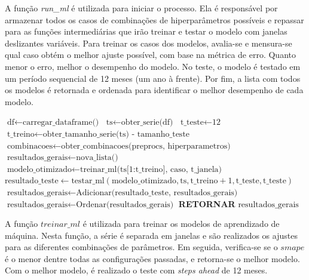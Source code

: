 \documentclass[12pt]{tcc}
\begin{document}
A função \textit{run\_ml} é utilizada para iniciar o processo. Ela é responsável por armazenar todos os casos de combinações de hiperparâmetros possíveis e repassar para as funções intermediárias que irão treinar e testar o modelo com janelas deslizantes variáveis. Para treinar os casos dos modelos, avalia-se e mensura-se qual caso obtém o melhor ajuste possível, com base na métrica de erro. Quanto menor o erro, melhor o desempenho do modelo. No teste, o modelo é testado em um período sequencial de 12 meses (um ano à frente). Por fim, a lista com todos os modelos é retornada e ordenada para identificar o melhor desempenho de cada modelo.

\begin{algorithm}
\caption{run\_ml}
\label{alg:main_experiment}
\begin{algorithmic}[1]
\State $\text{df} \gets \text{carregar\_dataframe()}$
\State $\text{ts} \gets \text{obter\_serie(df)}$
\State $\text{t\_teste} \gets \text{12}$
\State $\text{t\_treino} \gets \text{obter\_tamanho\_serie(ts) - tamanho\_teste}$
\State $\text{combinacoes} \gets \text{obter\_combinacoes(preprocs, hiperparametros)}$
\State $\text{resultados\_gerais} \gets \text{nova\_lista()}$
    \State $\text{modelo\_otimizado} \gets \text{treinar\_ml(ts[1:t\_treino], caso, t\_janela)}$
    \State $\text{resultado\_teste} \gets \text{testar\_ml}(\text{modelo\_otimizado}, \text{ts}, \text{t\_treino} + 1, \text{t\_teste}, \text{t\_teste})$
    \State $\text{resultados\_gerais} \gets \text{Adicionar(resultado\_teste, resultados\_gerais)}$
\EndFor
\State $\text{resultados\_gerais} \gets \text{Ordenar(resultados\_gerais)}$
\State \textbf{RETORNAR} $\text{resultados\_gerais}$
\end{algorithmic}
\end{algorithm}

A função $treinar\_ml$ é utilizada para treinar os modelos de aprendizado de máquina. Nesta função, a série é separada em janelas e são realizados os ajustes para as diferentes combinações de parâmetros. Em seguida, verifica-se se o $smape$ é o menor dentre todas as configurações passadas, e retorna-se o melhor modelo. Com o melhor modelo, é realizado o teste com \textit{steps ahead} de 12 meses. 
\end{document}
